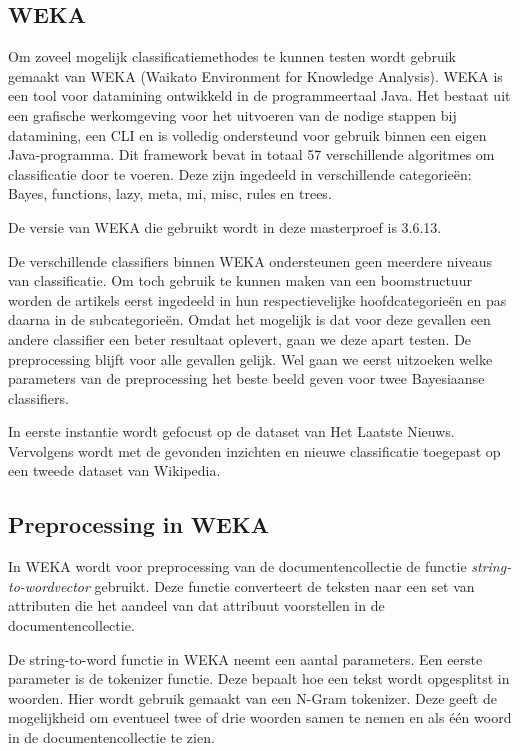 \subsection{WEKA}
Om zoveel mogelijk classificatiemethodes te kunnen testen wordt gebruik gemaakt van WEKA \cite{Hall2009} (Waikato Environment for Knowledge Analysis). WEKA is een tool voor datamining ontwikkeld in de programmeertaal Java. Het bestaat uit een grafische werkomgeving  voor het uitvoeren van de nodige stappen bij datamining, een CLI en is volledig ondersteund voor gebruik binnen een eigen Java-programma. Dit framework bevat in totaal 57 verschillende algoritmes om classificatie door te voeren. Deze zijn ingedeeld in verschillende categorie\"en: Bayes, functions, lazy, meta, mi, misc, rules en trees.

De versie van WEKA die gebruikt wordt in deze masterproef is 3.6.13.

De verschillende classifiers binnen WEKA ondersteunen geen meerdere niveaus van classificatie. Om toch gebruik te kunnen maken van een boomstructuur worden de artikels eerst ingedeeld in hun respectievelijke hoofdcategorie\"en en pas daarna in de subcategorie\"en. Omdat het mogelijk is dat voor deze gevallen een andere classifier een beter resultaat oplevert, gaan we deze apart testen. De preprocessing blijft voor alle gevallen gelijk. Wel gaan we eerst uitzoeken welke parameters van de preprocessing het beste beeld geven voor twee Bayesiaanse classifiers. 

In eerste instantie wordt gefocust op de dataset van Het Laatste Nieuws. Vervolgens wordt met de gevonden inzichten en nieuwe classificatie toegepast op een tweede dataset van Wikipedia. 

\subsection{Preprocessing in WEKA}
In WEKA wordt voor preprocessing van de documentencollectie de functie \textit{string-to-wordvector} gebruikt. Deze functie converteert de teksten naar een set van attributen die het aandeel van dat attribuut voorstellen in de documentencollectie. 

De string-to-word functie in WEKA neemt een aantal parameters. Een eerste parameter is de tokenizer functie. Deze bepaalt hoe een tekst wordt opgesplitst in woorden. Hier wordt gebruik gemaakt van een N-Gram tokenizer. Deze geeft de mogelijkheid om eventueel twee of drie woorden samen te nemen en als \'e\'en woord in de documentencollectie te zien.

